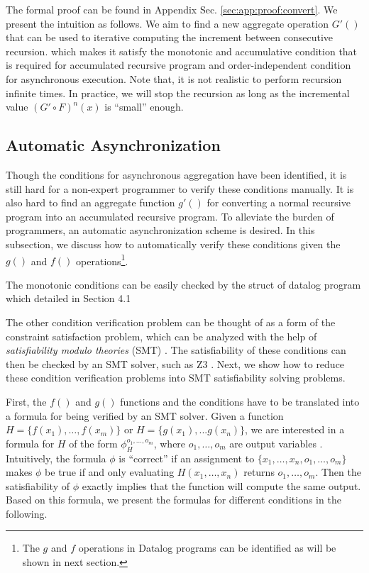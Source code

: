 The formal proof can be found in Appendix Sec. \ref{sec:app:proof:convert}. We present the intuition as follows. We aim to find a new aggregate operation $G'()$ that can be used to iterative computing the increment between consecutive recursion. which makes it satisfy the monotonic and accumulative condition that is required for accumulated recursive program and order-independent condition for asynchronous execution.
Note that, it is not realistic to perform recursion infinite times. In practice, we will stop the recursion as long as the incremental value $(G'\circ F)^n(x)$ is ``small'' enough.






\subsection{Automatic Asynchronization}
\label{sec:async:autoasync}

Though the conditions for asynchronous aggregation have been identified, it is still hard for a non-expert programmer to verify these conditions manually. It is also hard to find an aggregate function $g'()$ for converting a normal recursive program into an accumulated recursive program.
 To alleviate the burden of programmers, an automatic asynchronization scheme is desired. In this subsection, we discuss how to automatically verify these conditions given the $g()$ and $f()$ operations\footnote{The $g$ and $f$ operations in Datalog programs can be identified as will be shown in next section.}.
 
 
 The monotonic conditions can  be easily checked by the struct of datalog program which detailed in Section 4.1

The other condition verification problem can be thought of as a form of the constraint satisfaction problem, which can be analyzed with the help of \emph{satisfiability modulo theories} (SMT) \cite{53e486195688442995f82bfe28c55731}. The satisfiability of these conditions can then be checked by an SMT solver, such as Z3 \cite{DeMoura:2008:ZES:1792734.1792766}. Next, we show how to reduce these condition verification problems into SMT satisfiability solving problems.

First, the $f()$ and $g()$ functions and the conditions have to be translated into a formula for being verified by an SMT solver. Given a function $H=\{f(x_1),\ldots,f(x_m)\}$ or $H=\{g(x_1),...g(x_n)\}$, we are interested in a formula for $H$ of the form $\phi_H^{o_1,\ldots,o_m}$, where $o_1,\ldots,o_m$ are output variables \cite{Liu:2014:ADP:2670979.2670980}. Intuitively, the formula $\phi$ is ``correct'' if an assignment to $\{x_1,\ldots,x_n,o_1,\ldots,o_m\}$ makes $\phi$ be true if and only evaluating $H(x_1,\ldots,x_n)$ returns $o_1,\ldots,o_m$. Then the satisfiability of $\phi$ exactly implies that the function will compute the same output. Based on this formula, we present the formulas for different conditions in the following.


